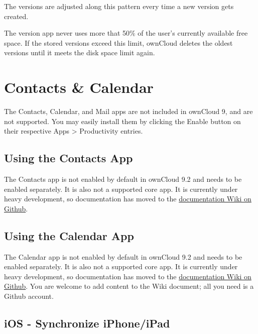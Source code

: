 \documentclass[letterpaper,10pt,english]{sphinxmanual}
\begin{document}
The versions are adjusted along this pattern every time a new version gets
created.

The version app never uses more that 50\% of the user's currently available free
space. If the stored versions exceed this limit, ownCloud deletes the oldest
versions until it meets the disk space limit again.


\chapter{Contacts \& Calendar}
\label{pim/index:contacts-calendar}\label{pim/index::doc}
The Contacts, Calendar, and Mail apps are not included in ownCloud 9, and are
not supported. You may easily install them by clicking the Enable button on
their respective Apps \textgreater{} Productivity entries.


\section{Using the Contacts App}
\label{pim/contacts:using-the-contacts-app}\label{pim/contacts::doc}
The Contacts app is not enabled by default in ownCloud 9.2 and needs to
be enabled separately. It is also not a supported core app. It is currently
under heavy development, so documentation has moved to the \href{https://github.com/owncloud/documentation/wiki/Using-the-Contacts-App-in-ownCloud-9.0}{documentation Wiki
on Github}.


\section{Using the Calendar App}
\label{pim/calendar::doc}\label{pim/calendar:using-the-calendar-app}
The Calendar app is not enabled by default in ownCloud 9.2 and needs to
be enabled separately. It is also not a supported core app. It is currently
under heavy development, so documentation has moved to the \href{https://github.com/owncloud/documentation/wiki/Using-the-Calendar-App-in-ownCloud-9.0}{documentation Wiki
on Github}. You are welcome to add content to the Wiki document; all you
need is a Github account.


\section{iOS - Synchronize iPhone/iPad}
\label{pim/sync_ios::doc}\label{pim/sync_ios:ios-synchronize-iphone-ipad}
\end{document}

